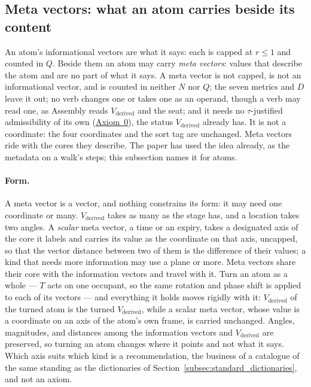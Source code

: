 \documentclass[12pt, a4paper]{article}
\begin{document}
\subsection{Meta vectors: what an atom carries beside its content}
\label{subsec:meta_vectors}
An atom's informational vectors are what it says: each is capped at
$r\le1$ and counted in $Q$. Beside them an atom may carry \emph{meta
vectors}: values that describe the atom and are no part of what it
says. A meta vector is not capped, is not an informational vector, and
is counted in neither $N$ nor $Q$; the seven metrics and $D$ leave
it out; no verb changes one or takes one as an operand, though a verb may
read one, as Assembly reads $V_{\text{derived}}$ and the seat; and it
needs no $\tau$-justified admissibility of its own (\hyperref[subsec:axiom0_admissibility]{Axiom~0}), the status
$V_{\text{derived}}$ already has. It is not a coordinate: the four
coordinates and the sort tag are unchanged. Meta vectors ride with the
cores they describe. The paper has used the idea already, as the
metadata on a walk's steps; this subsection names it for atoms.

\paragraph{Form.} A meta vector is a vector, and nothing constrains its
form: it may need one coordinate or many. $V_{\text{derived}}$ takes as
many as the stage has, and a location takes two angles. A \emph{scalar}
meta vector, a time or an expiry, takes a designated axis of the core it
labels and carries its value as the coordinate on that axis, uncapped, so
that the vector distance between two of them is the difference of their
values; a kind that needs more information may use a plane or more. Meta
vectors share their core with the information vectors and travel with it.
Turn an atom as a whole --- $T$ acts on one occupant, so the same
rotation and phase shift is applied to each of its vectors --- and
everything it holds moves rigidly with it: $V_{\text{derived}}$ of the
turned atom is the turned $V_{\text{derived}}$, while a scalar meta
vector, whose value is a coordinate on an axis of the atom's own frame, is
carried unchanged. Angles, magnitudes, and distances among the
information vectors and $V_{\text{derived}}$ are preserved, so turning an
atom changes where it points and not what it says. Which axis suits which
kind is a recommendation, the business of a catalogue of the same
standing as the dictionaries of
Section~\ref{subsec:standard_dictionaries}, and not an axiom.
\end{document}
